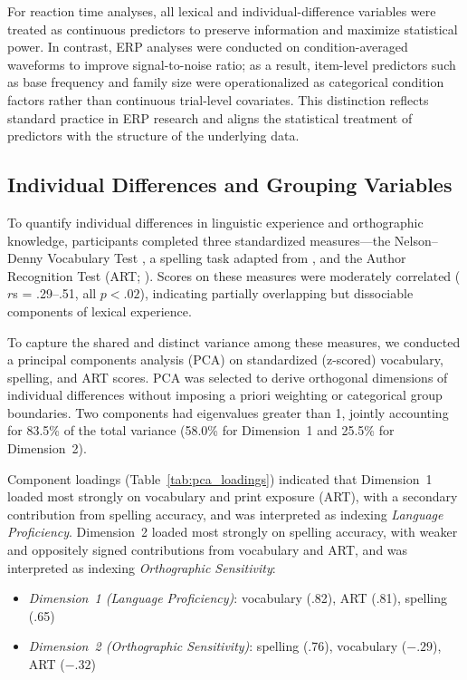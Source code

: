 \documentclass[utf8]{FrontiersinHarvard} %
\begin{document}
	For reaction time analyses, all lexical and individual-difference variables were treated as continuous predictors to preserve information and maximize statistical power. In contrast, ERP analyses were conducted on condition-averaged waveforms to improve signal-to-noise ratio; as a result, item-level predictors such as base frequency and family size were operationalized as categorical condition factors rather than continuous trial-level covariates. This distinction reflects standard practice in ERP research and aligns the statistical treatment of predictors with the structure of the underlying data.
	
	\subsection{Individual Differences and Grouping Variables}
	
	To quantify individual differences in linguistic experience and orthographic knowledge, participants completed three standardized measures—the Nelson–Denny Vocabulary Test \citep{brownNelsonDennyReadingTest1993}, a spelling task adapted from \citet{sawiIndividualDifferencesSensitivity2016}, and the Author Recognition Test (ART; \citealt{stanovichExposurePrintOrthographic1989}). Scores on these measures were moderately correlated ($r$s = .29–.51, all $p < .02$), indicating partially overlapping but dissociable components of lexical experience.
	
	To capture the shared and distinct variance among these measures, we conducted a principal components analysis (PCA) on standardized (z-scored) vocabulary, spelling, and ART scores. PCA was selected to derive orthogonal dimensions of individual differences without imposing a priori weighting or categorical group boundaries. Two components had eigenvalues greater than 1, jointly accounting for 83.5\% of the total variance (58.0\% for Dimension~1 and 25.5\% for Dimension~2).
	
	Component loadings (Table~\ref{tab:pca_loadings}) indicated that Dimension~1 loaded most strongly on vocabulary and print exposure (ART), with a secondary contribution from spelling accuracy, and was interpreted as indexing \textit{Language Proficiency}. Dimension~2 loaded most strongly on spelling accuracy, with weaker and oppositely signed contributions from vocabulary and ART, and was interpreted as indexing \textit{Orthographic Sensitivity}:
	
	\begin{itemize}
		\item[-] \textit{Dimension~1 (Language Proficiency)}: vocabulary (.82), ART (.81), spelling (.65)
		\item[-] \textit{Dimension~2 (Orthographic Sensitivity)}: spelling (.76), vocabulary ($- .29$), ART ($- .32$)
	\end{itemize}
	
\end{document}
